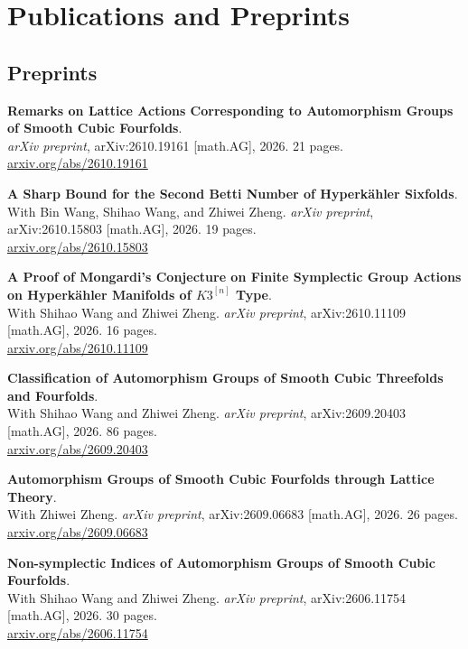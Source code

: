 \documentclass[11pt,a4paper]{article}
\begin{document}
\section{Publications and Preprints}
\subsection*{Preprints}
\begin{enumerate}[leftmargin=1.5em,label={[\arabic*]},itemsep=3pt]
  \item \textbf{Remarks on Lattice Actions Corresponding to Automorphism Groups of Smooth Cubic Fourfolds}.\\
  \emph{arXiv preprint}, arXiv:2610.19161 [math.AG], 2026. 21 pages.\\
  \href{https://arxiv.org/abs/2610.19161}{arxiv.org/abs/2610.19161}

  \item \textbf{A Sharp Bound for the Second Betti Number of Hyperk\"ahler Sixfolds}.\\
  With Bin Wang, Shihao Wang, and Zhiwei Zheng. \emph{arXiv preprint}, arXiv:2610.15803 [math.AG], 2026. 19 pages.\\
  \href{https://arxiv.org/abs/2610.15803}{arxiv.org/abs/2610.15803}

  \item \textbf{A Proof of Mongardi's Conjecture on Finite Symplectic Group Actions on Hyperk\"ahler Manifolds of $K3^{[n]}$ Type}.\\
  With Shihao Wang and Zhiwei Zheng. \emph{arXiv preprint}, arXiv:2610.11109 [math.AG], 2026. 16 pages.\\
  \href{https://arxiv.org/abs/2610.11109}{arxiv.org/abs/2610.11109}

  \item \textbf{Classification of Automorphism Groups of Smooth Cubic Threefolds and Fourfolds}.\\
  With Shihao Wang and Zhiwei Zheng. \emph{arXiv preprint}, arXiv:2609.20403 [math.AG], 2026. 86 pages.\\
  \href{https://arxiv.org/abs/2609.20403}{arxiv.org/abs/2609.20403}

  \item \textbf{Automorphism Groups of Smooth Cubic Fourfolds through Lattice Theory}.\\
  With Zhiwei Zheng. \emph{arXiv preprint}, arXiv:2609.06683 [math.AG], 2026. 26 pages.\\
  \href{https://arxiv.org/abs/2609.06683}{arxiv.org/abs/2609.06683}

  \item \textbf{Non-symplectic Indices of Automorphism Groups of Smooth Cubic Fourfolds}.\\
  With Shihao Wang and Zhiwei Zheng. \emph{arXiv preprint}, arXiv:2606.11754 [math.AG], 2026. 30 pages.\\
  \href{https://arxiv.org/abs/2606.11754}{arxiv.org/abs/2606.11754}
\end{enumerate}
\end{document}
